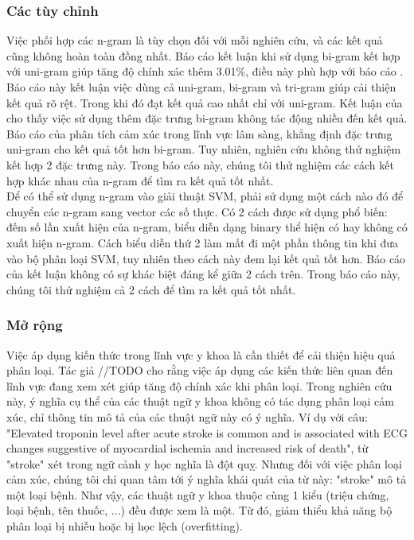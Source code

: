 \subsubsection*{Các tùy chỉnh}
Việc phối hợp các n-gram là tùy chọn đối với mỗi nghiên cứu, và các kết quả cũng không hoàn toàn đồng nhất. Báo cáo \cite{niu2005analysis} kết luận khi sử dụng bi-gram kết hợp với uni-gram giúp tăng độ chính xác thêm 3.01\%, điều này phù hợp với báo cáo \cite{sarker2011outcome}. Báo cáo này kết luận việc dùng cả uni-gram, bi-gram và tri-gram giúp cải thiện kết quả rõ rệt. Trong khi đó \cite{pang2002thumbs} đạt kết quả cao nhất chỉ với uni-gram. Kết luận của \cite{pang2002thumbs} cho thấy việc sử dụng thêm đặc trưng bi-gram không tác động nhiều đến kết quả. Báo cáo của \cite{smith2012cross} phân tích cảm xúc trong lĩnh vực lâm sàng, khẳng định đặc trưng uni-gram cho kết quả tốt hơn bi-gram. Tuy nhiên, nghiên cứu không thử nghiệm kết hợp 2 đặc trưng này. Trong báo cáo này, chúng tôi thử nghiệm các cách kết hợp khác nhau của n-gram để tìm ra kết quả tốt nhất.\\

Để có thể sử dụng n-gram vào giải thuật SVM, phải sử dụng một cách nào đó để chuyển các n-gram sang vector các số thực. Có 2 cách được sử dụng phổ biến: đếm số lần xuất hiện của n-gram, biểu diễn dạng binary thể hiện có hay không có xuất hiện n-gram. Cách biểu diễn thứ 2 làm mất đi một phần thông tin khi đưa vào bộ phân loại SVM, tuy nhiên theo \cite{pang2002thumbs} cách này đem lại kết quả tốt hơn. Báo cáo của \cite{sarker2011outcome} kết luận không có sự khác biệt đáng kể giữa 2 cách trên. Trong báo cáo này, chúng tôi thử nghiệm cả 2 cách để tìm ra kết quả tốt nhất.
\subsubsection*{Mở rộng}
Việc áp dụng kiến thức trong lĩnh vực y khoa là cần thiết để cải thiện hiệu quả phân loại. Tác giả //TODO cho rằng việc áp dụng các kiến thức liên quan đến lĩnh vực đang xem xét giúp tăng độ chính xác khi phân loại. Trong nghiên cứu này, ý nghĩa cụ thể của các thuật ngữ y khoa không có tác dụng phân loại cảm xúc, chỉ thông tin mô tả của các thuật ngữ này có ý nghĩa. Ví dụ với câu: "Elevated troponin level after acute stroke is common and is associated with ECG changes suggestive of myocardial ischemia and increased risk of death", từ "stroke" xét trong ngữ cảnh y học nghĩa là đột quỵ. Nhưng đối với việc phân loại cảm xúc, chúng tôi chỉ quan tâm tới ý nghĩa khái quát của từ này: "stroke" mô tả một loại bệnh. Như vậy, các thuật ngữ y khoa thuộc cùng 1 kiểu (triệu chứng, loại bệnh, tên thuốc, ...) đều được xem là một. Từ đó, giảm thiểu khả năng bộ phân loại bị nhiễu hoặc bị học lệch (overfitting).\\

